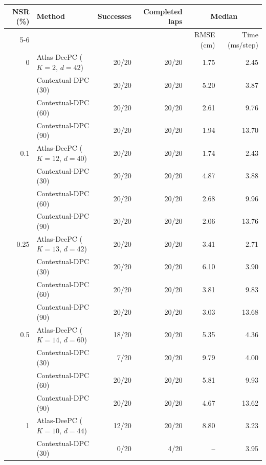 \begin{table}[t]
    \centering
    \begingroup
    \footnotesize
    \setlength{\tabcolsep}{6pt}
    \renewcommand{\arraystretch}{1.05}
    \begin{tabular}{@{}rlrrrr@{}}
        \toprule
        NSR (\%) & Method & Successes & Completed laps
        & \multicolumn{2}{c}{Median} \\
        \cmidrule(l){5-6}
        & & & & RMSE (cm) & Time (ms/step) \\
        \midrule
        0 & Atlas-DeePC ($K=2$, $d=42$) & 20/20 & 20/20 & 1.75 & 2.45 \\
        & Contextual-DPC (30) & 20/20 & 20/20 & 5.20 & 3.87 \\
        & Contextual-DPC (60) & 20/20 & 20/20 & 2.61 & 9.76 \\
        & Contextual-DPC (90) & 20/20 & 20/20 & 1.94 & 13.70 \\
        \midrule
        0.1 & Atlas-DeePC ($K=12$, $d=40$) & 20/20 & 20/20 & 1.74 & 2.43 \\
        & Contextual-DPC (30) & 20/20 & 20/20 & 4.87 & 3.88 \\
        & Contextual-DPC (60) & 20/20 & 20/20 & 2.68 & 9.96 \\
        & Contextual-DPC (90) & 20/20 & 20/20 & 2.06 & 13.76 \\
        \midrule
        0.25 & Atlas-DeePC ($K=13$, $d=42$) & 20/20 & 20/20 & 3.41 & 2.71 \\
        & Contextual-DPC (30) & 20/20 & 20/20 & 6.10 & 3.90 \\
        & Contextual-DPC (60) & 20/20 & 20/20 & 3.81 & 9.83 \\
        & Contextual-DPC (90) & 20/20 & 20/20 & 3.03 & 13.68 \\
        \midrule
        0.5 & Atlas-DeePC ($K=14$, $d=60$) & 18/20 & 20/20 & 5.35 & 4.36 \\
        & Contextual-DPC (30) & 7/20 & 20/20 & 9.79 & 4.00 \\
        & Contextual-DPC (60) & 20/20 & 20/20 & 5.81 & 9.93 \\
        & Contextual-DPC (90) & 20/20 & 20/20 & 4.67 & 13.62 \\
        \midrule
        1 & Atlas-DeePC ($K=10$, $d=44$) & 12/20 & 20/20 & 8.80 & 3.23 \\
        & Contextual-DPC (30) & 0/20 & 4/20 & -- & 3.95 \\

\end{tabular}
\end{table}
